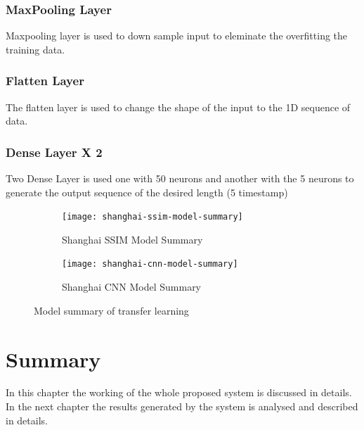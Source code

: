 	\subsubsection{MaxPooling Layer}
		Maxpooling layer is used to down sample input to eleminate the overfitting the training data.

	\subsubsection{Flatten Layer}
		The flatten layer is used to change the shape of the input to the 1D sequence of data.

	\subsubsection{Dense Layer X 2}
		Two Dense Layer is used one with 50 neurons and another with the 5 neurons to generate the output sequence of the desired length (5 timestamp)


\begin{figure}[ht]
	\centering
	\begin{subfigure}[b]{0.80\textwidth}
		\centering
		\texttt{[image: shanghai-ssim-model-summary]}
		\caption{Shanghai SSIM Model Summary}
		\label{fig:shanghai-ssim-model-summary}
	\end{subfigure}
	\hfill
	\begin{subfigure}[b]{0.80\textwidth}
		\centering
		\texttt{[image: shanghai-cnn-model-summary]}
		\caption{Shanghai CNN Model Summary}
		\label{fig:shanghai-cnn-model-summary}
	\end{subfigure}
	\caption{Model summary of transfer learning}
	\label{fig:model-summary}
\end{figure}

\section{Summary}
In this chapter the working of the whole proposed system is discussed in details. In the next chapter the results generated by the system is analysed and described in details.